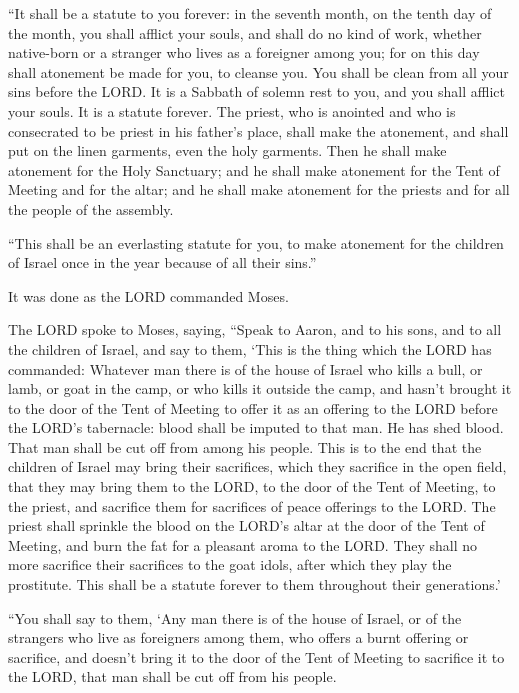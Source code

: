 \myverse{}“It shall be a statute to you forever: in the seventh month,
on the tenth day of the month, you shall afflict your souls, and shall do no kind of work, whether native-born
or a stranger who lives as a foreigner among you;
\myverse{}for on this day shall atonement be made for you, to cleanse you. You shall
be clean from all your sins before the LORD.
\myverse{}It is a Sabbath of solemn rest to you, and you shall afflict your souls.
It is a statute forever.
\myverse{}The priest, who is anointed and who is consecrated to be priest in his father’s
place, shall make the atonement, and shall put on the linen garments, even the holy garments.
\myverse{}Then he shall make atonement for the Holy Sanctuary; and he shall make atonement
for the Tent of Meeting and for the altar; and he shall make atonement for the priests and for all the
people of the assembly.


\myverse{}“This shall be an everlasting statute for you, to make atonement
for the children of Israel once in the year because of all their sins.”

It was done as the LORD commanded Moses.


\mychapter{} \myverse*{}The LORD spoke to Moses, saying,
\myverse{}“Speak to Aaron, and to his sons, and to all the children of Israel, and say
to them, ‘This is the thing which the LORD has commanded:
\myverse{}Whatever man there is of the house of Israel who kills a bull, or lamb, or
goat in the camp, or who kills it outside the camp,
\myverse{}and hasn’t brought it to the door of the Tent of Meeting to offer it as an
offering to the LORD before the LORD’s tabernacle: blood shall be imputed to that man. He has shed blood.
That man shall be cut off from among his people.
\myverse{}This is to the end that the children of Israel may bring their sacrifices,
which they sacrifice in the open field, that they may bring them to the LORD, to the door of the Tent
of Meeting, to the priest, and sacrifice them for sacrifices of peace offerings to the LORD.
\myverse{}The priest shall sprinkle the blood on the LORD’s altar at the door of the
Tent of Meeting, and burn the fat for a pleasant aroma to the LORD.
\myverse{}They shall no more sacrifice their sacrifices to the goat idols, after which
they play the prostitute. This shall be a statute forever to them throughout their generations.’


\myverse{}“You shall say to them, ‘Any man there is of the house of Israel,
or of the strangers who live as foreigners among them, who offers a burnt offering or sacrifice,
\myverse{}and doesn’t bring it to the door of the Tent of Meeting to sacrifice it to
the LORD, that man shall be cut off from his people.



